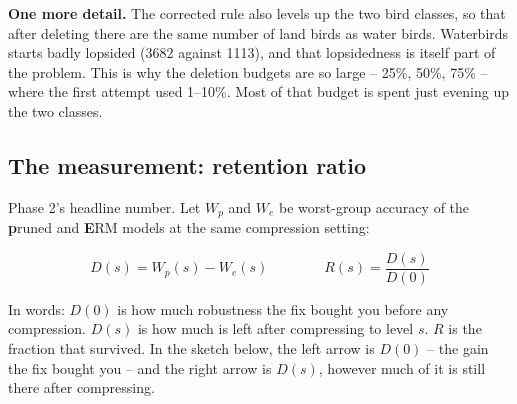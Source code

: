 \documentclass[11pt]{article}
\newcommand{\wg}{worst-group}
\begin{document}
\textbf{One more detail.} The corrected rule also levels up the two bird
classes, so that after deleting there are the same number of land birds as water
birds. Waterbirds starts badly lopsided (3682 against 1113), and that lopsidedness
is itself part of the problem. This is why the deletion budgets are so large --
25\%, 50\%, 75\% -- where the first attempt used 1--10\%. Most of that budget is
spent just evening up the two classes.

\subsection{The measurement: retention ratio}

Phase 2's headline number. Let $W_p$ and $W_e$ be \wg{} accuracy of the
\textbf{p}runed and \textbf{E}RM models at the same compression setting:

\[
  D(s) = W_p(s) - W_e(s) \qquad\qquad R(s) = \frac{D(s)}{D(0)}
\]

\noindent In words: $D(0)$ is how much robustness the fix bought you before any
compression. $D(s)$ is how much is left after compressing to level $s$. $R$ is
the fraction that survived. In the sketch below, the left arrow is $D(0)$ --
the gain the fix bought you -- and the right arrow is $D(s)$, however much of
it is still there after compressing.

\begin{center}
\end{center}
\end{document}
